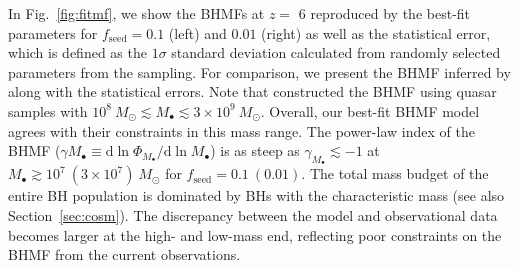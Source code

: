 \documentclass[twocolumn, twocolappendix]{aastex63}
\newcommand{\Msun}{M_\odot}
\newcommand{\Mbh}{M_\bullet}
\newcommand{\fseed}{f_\mathrm{seed}}
\newcommand{\D}{\mathrm{d}}
\begin{document}
\begin{CJK*}{UTF8}{gbsn}
In Fig.~\ref{fig:fitmf}, we show the BHMFs at $z=$ 6 reproduced by the best-fit parameters for 
$\fseed = 0.1$ (left) and $0.01$ (right) as well as the statistical error, 
which is defined as the $1\sigma$ standard deviation calculated from randomly selected parameters from the sampling.
For comparison, we present the BHMF inferred by  along with the statistical errors.
Note that  constructed the BHMF using quasar samples with 
$10^8~\Msun \lesssim \Mbh \lesssim 3\times 10^9~\Msun$.
Overall, our best-fit BHMF model agrees with their constraints in this mass range.
The power-law index of the BHMF ($\gamma{M_\bullet} \equiv \D \ln \Phi_{M_\bullet}/\D \ln M_\bullet$) is as steep as $\gamma_{M_\bullet}\lesssim -1$
at $M_\bullet \gtrsim 10^7~(3\times 10^7)~\Msun$ for $\fseed = 0.1 ~(0.01)$.
The total mass budget of the entire BH population is dominated by BHs with the characteristic mass (see also Section~\ref{sec:cosm}). 
The discrepancy between the model and observational data becomes larger at the high- and low-mass end,
reflecting poor constraints on the BHMF from the current observations.



\end{CJK*}
\end{document}
